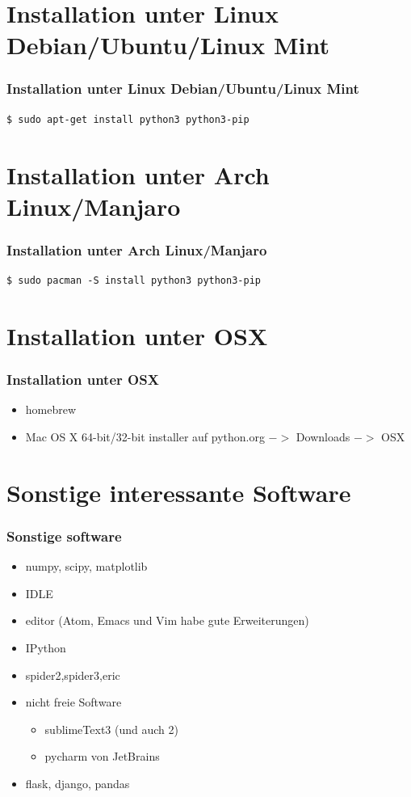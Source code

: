 \documentclass{beamer}
\begin{document}
\section{Installation unter Linux Debian/Ubuntu/Linux Mint}
\begin{frame}[fragile]
  \frametitle{Installation unter Linux Debian/Ubuntu/Linux Mint}
  \begin{lstlisting}[numbers=none]
    $ sudo apt-get install python3 python3-pip
  \end{lstlisting}
\end{frame}
\section{Installation unter Arch Linux/Manjaro}
\begin{frame}[fragile]
  \frametitle{Installation unter Arch Linux/Manjaro}
  \begin{lstlisting}[numbers=none]
    $ sudo pacman -S install python3 python3-pip
  \end{lstlisting}
\end{frame}
\section{Installation unter OSX}
\begin{frame}
  \frametitle{Installation unter OSX}
  \begin{itemize}
    \item homebrew
    \item Mac OS X 64-bit/32-bit installer auf python.org $->$ Downloads $->$ OSX
  \end{itemize}
\end{frame}
\section{Sonstige interessante Software}
\begin{frame}
  \frametitle{Sonstige software}
  \begin{itemize}
  \item numpy, scipy, matplotlib
  \item IDLE
  \item editor (Atom, Emacs und Vim habe gute Erweiterungen)
  \item IPython
  \item spider2,spider3,eric
  \item nicht freie Software
    \begin{itemize}
    \item sublimeText3 (und auch 2)
    \item pycharm von JetBrains
    \end{itemize}
  \item flask, django, pandas
  \end{itemize}
\end{frame}
\end{document}
